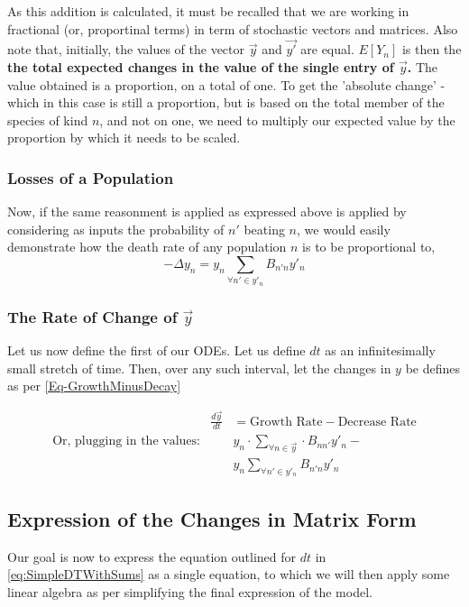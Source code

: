 \documentclass[border=1pt]{article}
\begin{document}
As this addition is calculated, it must be recalled that we are working in fractional (or, proportinal terms) in term of stochastic vectors and matrices. Also note that, initially, the values of the vector $\vec{y}$ and $\vec{y'}$ are equal. $E[Y_n]$ is then the \textbf{the total expected changes in the value of the single entry of $\vec{y}$.} The value obtained is a proportion, on a total of one. To get the 'absolute change' -  which in this case is still a proportion, but is based on the total member of the species of kind $n$, and not on one, we need to multiply our expected value by the proportion by which it needs to be scaled.  
\subsubsection{Losses of a Population}
	Now, if the same reasonment is applied as expressed above is applied by considering as inputs the probability of $n'$ beating $n$, we would easily demonstrate how the death rate of any population $n$ is to be proportional to,
	\begin{equation}
		-\Delta y_n= y_n \sum_{\forall n' \in y'_n} B_{n'n}y'_n
	\end{equation}

\subsubsection{The Rate of Change of $\vec{y}$}
Let us now define the first of our ODEs. Let us define $dt$ as an infinitesimally small stretch of time. Then, over any such interval, let the changes in $y$ be defines as per \autoref{Eq-GrowthMinusDecay}

\begin{eqnarray}
\label{eq:SimpleDTWithSums}
	&\frac{d \vec{y}}{dt}&= \text{Growth Rate} - \text{Decrease Rate}\\
	\text{Or, plugging in the values:}& & y_n \cdot \sum_{\forall n \in \vec{y}} \cdot B_{nn'} y'_{n} -\\ 
	& & y_n \sum_{\forall n' \in y'_n} B_{n'n}y'_n
\end{eqnarray}

\subsection{Expression of the Changes in Matrix Form}
Our goal is now to express the equation outlined for $dt$ in \autoref{eq:SimpleDTWithSums} as a single equation, to which we will then apply some linear algebra as per simplifying the final expression of the model. 
\end{document}

